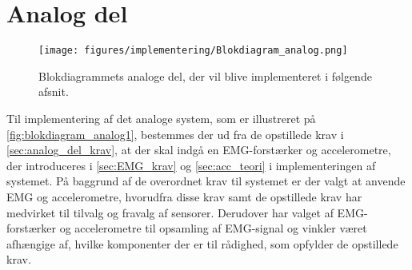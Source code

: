 \section{Analog del}
\begin{figure}[H]
\centering
\texttt{[image: figures/implementering/Blokdiagram\_analog.png]}
\caption{Blokdiagrammets analoge del, der vil blive implementeret i følgende afsnit.}
\label{fig:blokdiagram_analog1}
\end{figure}

\noindent
Til implementering af det analoge system, som er illustreret på \autoref{fig:blokdiagram_analog1}, bestemmes der ud fra de opstillede krav i \autoref{sec:analog_del_krav}, at der skal indgå en EMG-forstærker og accelerometre, der introduceres i \autoref{sec:EMG_krav} og \autoref{sec:acc_teori} i implementeringen af systemet. På baggrund af de overordnet krav til systemet er der valgt at anvende EMG og accelerometre, hvorudfra disse krav samt de opstillede krav har medvirket til tilvalg og fravalg af sensorer. Derudover har valget af EMG-forstærker og accelerometre til opsamling af EMG-signal og vinkler været afhængige af, hvilke komponenter der er til rådighed, som opfylder de opstillede krav. 





